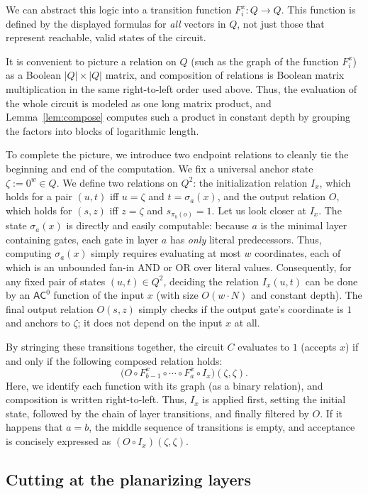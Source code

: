 \documentclass[11pt]{article}
\theoremstyle{definition}
\theoremstyle{remark}
\newcommand{\AC}{\mathsf{AC}^0}
\newcommand{\comp}{\circ}
\begin{document}
We can abstract this logic into a transition function $F^x_i\colon Q\to Q$. This function is defined by the displayed formulas for \emph{all} vectors in $Q$, not just those that represent reachable, valid states of the circuit.

It is convenient to picture a relation on $Q$ (such as the graph of the function $F^x_i$) as a Boolean $|Q|\times|Q|$ matrix, and composition of relations is Boolean matrix multiplication in the same right-to-left order used above. Thus, the evaluation of the whole circuit is modeled as one long matrix product, and Lemma~\ref{lem:compose} computes such a product in constant depth by grouping the factors into blocks of logarithmic length.

To complete the picture, we introduce two endpoint relations to cleanly tie the beginning and end of the computation. We fix a universal anchor state $\zeta:=0^{w}\in Q$. We define two relations on $Q^2$: the initialization relation $I_x$, which holds for a
pair $(u,t)$ iff $u=\zeta$ and $t=\sigma_a(x)$, and the output relation $O$, which holds
for $(s,z)$ iff $z=\zeta$ and $s_{\pi_b(o)}=1$.  Let us look closer at $I_x$. The state $\sigma_a(x)$ is directly and easily computable: because $a$ is the minimal layer containing gates, each gate in layer $a$ has \emph{only} literal predecessors. Thus, computing $\sigma_a(x)$ simply requires evaluating at most $w$ coordinates, each of which is an unbounded fan-in $\mathrm{AND}$ or $\mathrm{OR}$ over literal values. Consequently, for any fixed pair of states $(u,t)\in Q^2$, deciding the relation $I_x(u,t)$ can be done by an $\AC$ function of the input $x$ (with size $O(w\cdot N)$ and constant depth). The final output relation $O(s,z)$ simply checks if the output gate's coordinate is $1$ and anchors to $\zeta$; it does not depend on the input $x$ at all.

By stringing these transitions together, the circuit $C$ evaluates to $1$ (accepts $x$) if and only if the following composed relation holds:
\[
\bigl(O\comp F^x_{b-1}\comp\cdots\comp F^x_{a}\comp I_x\bigr)(\zeta,\zeta).
\]
Here, we identify each function with its graph (as a binary relation), and composition is written right-to-left. Thus, $I_x$ is applied first, setting the initial state, followed by the chain of layer transitions, and finally filtered by $O$. If it happens that $a=b$, the middle sequence of transitions is empty, and acceptance is concisely expressed as $(O\comp I_x)(\zeta,\zeta)$.

\subsection{Cutting at the planarizing layers}\label{sec:halfopen}
\end{document}
